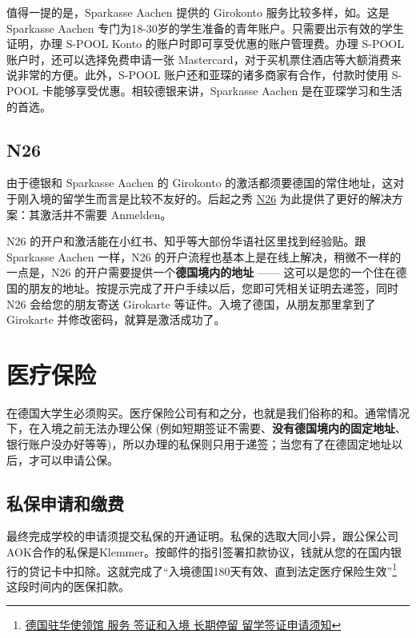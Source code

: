    值得一提的是，Sparkasse Aachen 提供的 Girokonto 服务比较多样，如\href{https://www.sparkasse-aachen.de/de/home/privatkunden/girokonto/s-pool.html}{}。这是 Sparkasse Aachen 专门为18-30岁的学生准备的青年账户。只需要出示有效的学生证明，办理 S-POOL Konto 的账户时即可享受优惠的账户管理费。办理 S-POOL 账户时，还可以选择免费申请一张 Mastercard，对于买机票住酒店等大额消费来说非常的方便。此外，S-POOL 账户还和亚琛的诸多商家有合作，付款时使用 S-POOL 卡能够享受优惠。相较德银来讲，Sparkasse Aachen 是在亚琛学习和生活的首选。

  \subsection{N26}\label{subsec:N26}

    由于德银和 Sparkasse Aachen 的 Girokonto 的激活都须要德国的常住地址，这对于刚入境的留学生而言是比较不友好的。后起之秀 \href{https://n26.com/en-de}{N26} 为此提供了更好的解决方案：其激活并不需要 Anmelden。

    N26 的开户和激活能在小红书、知乎等大部份华语社区里找到经验贴。跟 Sparkasse Aachen 一样，N26 的开户流程也基本上是在线上解决，稍微不一样的一点是，N26 的开户需要提供一个\textbf{德国境内的地址} —— 这可以是您的一个住在德国的朋友的地址。按提示完成了开户手续以后，您即可凭相关证明去递签，同时 N26 会给您的朋友寄送 Girokarte 等证件。入境了德国，从朋友那里拿到了 Girokarte 并修改密码，就算是激活成功了。

\section{医疗保险}\label{sec:医疗保险}

在德国大学生必须购买。医疗保险公司有和之分，也就是我们俗称的和。通常情况下，在入境之前无法办理公保 (例如短期签证不需要、\textbf{没有德国境内的固定地址}、银行账户没办好等等)，所以办理的私保则只用于递签；当您有了在德固定地址以后，才可以申请公保。

  \subsection{私保申请和缴费}\label{subsec:私保申请和缴费}

    最终完成学校的申请须提交私保的开通证明。私保的选取大同小异，跟公保公司AOK合作的私保是Klemmer。按邮件的指引签署扣款协议，钱就从您的在国内银行的贷记卡中扣除。这就完成了``入境德国180天有效、直到法定医疗保险生效''\footnote{\href{https://china.diplo.de/blob/1341652/cd1526772cd3d64a3f122f07d908a16b/pdf-merkblatt-natvisum-studium-data.pdf}{德国驻华使领馆\MVRightarrow{} 服务\MVRightarrow{} 签证和入境\MVRightarrow{} 长期停留\MVRightarrow{} 留学签证申请须知}} 这段时间内的医保扣款。

